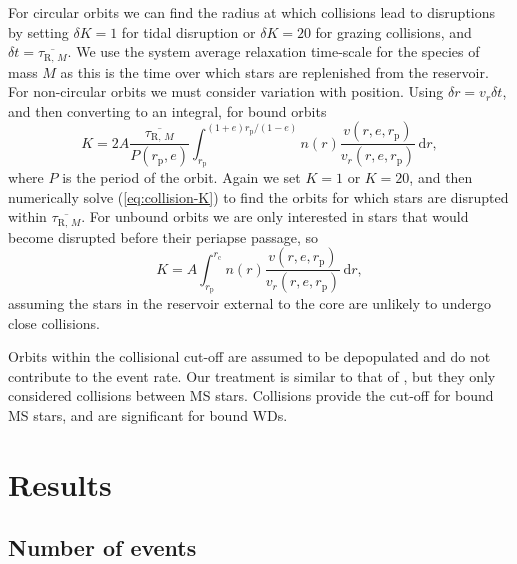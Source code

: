 \documentclass[useAMS,usedcolumn,usegraphicx,usenatbib]{mn2e}
\newcommand{\eqnref}[1]{(\ref{eq:#1})}
\newcommand{\sub}[1]{\ensuremath{_\mathrm{#1}}}
\newcommand{\dd}{\ensuremath{\mathrm{d}}}
\newcommand{\intd}[4]{\ensuremath{\displaystyle \int_{#1}^{#2}{#3}\,\dd{#4}}}
\begin{document}
For circular orbits we can find the radius at which collisions lead to disruptions by setting $\delta K = 1$ for tidal disruption or $\delta K = 20$ for grazing collisions, and $\delta t = \overline{\tau_{\mathrm{R},\,M}}$. We use the system average relaxation time-scale for the species of mass $M$ as this is the time over which stars are replenished from the reservoir. For non-circular orbits we must consider variation with position. Using $\delta r = v_r \delta t$, and then converting to an integral, for bound orbits
\begin{equation}
K = 2 A \frac{\overline{\tau_{\mathrm{R},\,M}}}{P(r\sub{p},e)}\intd{r\sub{p}}{(1+e)r\sub{p}/(1-e)}{n(r)\frac{v(r,e,r\sub{p})}{v_r(r,e,r\sub{p})}}{r},
\label{eq:collision-K}
\end{equation}
where $P$ is the period of the orbit. Again we set $K = 1$ or $K = 20$, and then numerically solve \eqnref{collision-K} to find the orbits for which stars are disrupted within $\overline{\tau_{\mathrm{R},\,M}}$. For unbound orbits we are only interested in stars that would become disrupted before their periapse passage, so
\begin{equation}
K = A \intd{r\sub{p}}{r\sub{c}}{n(r)\frac{v(r,e,r\sub{p})}{v_r(r,e,r\sub{p})}}{r},
\end{equation}
assuming the stars in the reservoir external to the core are unlikely to undergo close collisions.

Orbits within the collisional cut-off are assumed to be depopulated and do not contribute to the event rate. Our treatment is similar to that of \citet{Hopman2007}, but they only considered collisions between MS stars. Collisions provide the cut-off for bound MS stars, and are significant for bound WDs.

\section{Results}\label{sec:Gal-Results}

\subsection{Number of events}\label{sec:no-events}
\end{document}
